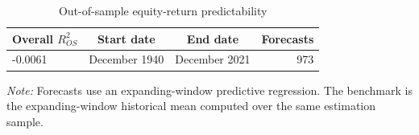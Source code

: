 \begin{table}[htbp]
\centering
\caption{Out-of-sample equity-return predictability}
\label{tab:q2d_results}
\begin{tabular}{lccr}
\toprule
Overall $R^2_{OS}$ & Start date & End date & Forecasts \\
\midrule
-0.0061 & December 1940 & December 2021 & 973 \\
\bottomrule
\end{tabular}
\begin{minipage}{0.92\textwidth}
\footnotesize\textit{Note:} Forecasts use an expanding-window predictive regression. The benchmark is the expanding-window historical mean computed over the same estimation sample.
\end{minipage}
\end{table}
